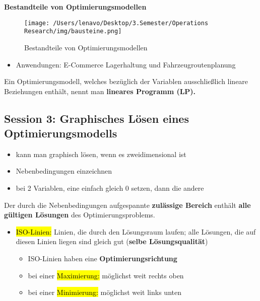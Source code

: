 \documentclass[a4paper, 10pt]{article}
\begin{document}
\textbf{Bestandteile von Optimierungsmodellen}\\
\begin{figure} [h]
    \centering
    \texttt{[image: /Users/lenavo/Desktop/3.Semester/Operations Research/img/bausteine.png]}
    \caption{Bestandteile von Optimierungsmodellen}
    \label{fig:enter-label}
\end{figure}
\begin{itemize}
    \item Anwendungen: E-Commerce Lagerhaltung und Fahrzeugroutenplanung
\end{itemize}
\begin{definitionbox}
    Ein Optimierungsmodell, welches bezüglich der Variablen ausschließlich lineare Beziehungen enthält, nennt man \textbf{lineares Programm (LP).}
\end{definitionbox}

\subsection{Session 3: Graphisches Lösen eines Optimierungsmodells}
\begin{itemize}
    \item kann man graphisch lösen, wenn es zweidimensional ist
    \item Nebenbedingungen einzeichnen
    \item bei 2 Variablen, eine einfach gleich 0 setzen, dann die andere
\end{itemize}
\begin{definitionbox}
    Der durch die Nebenbedingungen
aufgespannte \textbf{zulässige Bereich} enthält
\textbf{alle gültigen Lösungen} des
Optimierungsproblems.
\end{definitionbox}
\begin{itemize}
    \item \hl{ISO-Linien:} Linien, die durch den Lösungsraum laufen; alle Lösungen, die auf diesen Linien liegen sind gleich gut (\textbf{selbe Lösungsqualität})
    \begin{itemize}
        \item ISO-Linien haben eine \textbf{Optimierungsrichtung}
        \item bei einer \hl{Maximierung:} möglichst weit rechts oben
        \item bei einer \hl{Minimierung:} möglichst weit links unten
    \end{itemize}
\end{itemize}
\end{document}
